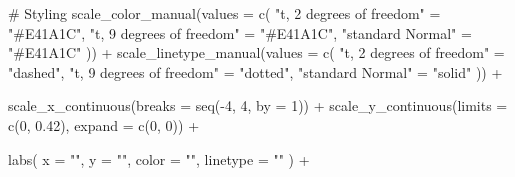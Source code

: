 \documentclass[
  letterpaper,
  DIV=11,
  numbers=noendperiod]{scrreprt}
\newenvironment{Shaded}{\begin{snugshade}}{\end{snugshade}}
\newcommand{\AttributeTok}[1]{\textcolor[rgb]{0.40,0.45,0.13}{#1}}
\newcommand{\CommentTok}[1]{\textcolor[rgb]{0.37,0.37,0.37}{#1}}
\newcommand{\DecValTok}[1]{\textcolor[rgb]{0.68,0.00,0.00}{#1}}
\newcommand{\FloatTok}[1]{\textcolor[rgb]{0.68,0.00,0.00}{#1}}
\newcommand{\FunctionTok}[1]{\textcolor[rgb]{0.28,0.35,0.67}{#1}}
\newcommand{\NormalTok}[1]{\textcolor[rgb]{0.00,0.23,0.31}{#1}}
\newcommand{\OtherTok}[1]{\textcolor[rgb]{0.00,0.23,0.31}{#1}}
\newcommand{\SpecialCharTok}[1]{\textcolor[rgb]{0.37,0.37,0.37}{#1}}
\newcommand{\StringTok}[1]{\textcolor[rgb]{0.13,0.47,0.30}{#1}}
\begin{document}
\begin{Shaded}
\begin{Highlighting}[]
  \CommentTok{\# Styling}
  \FunctionTok{scale\_color\_manual}\NormalTok{(}\AttributeTok{values =} \FunctionTok{c}\NormalTok{(}
    \StringTok{"t, 2 degrees of freedom"} \OtherTok{=} \StringTok{"\#E41A1C"}\NormalTok{,}
    \StringTok{"t, 9 degrees of freedom"} \OtherTok{=} \StringTok{"\#E41A1C"}\NormalTok{,}
    \StringTok{"standard Normal"} \OtherTok{=} \StringTok{"\#E41A1C"}
\NormalTok{  )) }\SpecialCharTok{+}
  \FunctionTok{scale\_linetype\_manual}\NormalTok{(}\AttributeTok{values =} \FunctionTok{c}\NormalTok{(}
    \StringTok{"t, 2 degrees of freedom"} \OtherTok{=} \StringTok{"dashed"}\NormalTok{,}
    \StringTok{"t, 9 degrees of freedom"} \OtherTok{=} \StringTok{"dotted"}\NormalTok{,}
    \StringTok{"standard Normal"} \OtherTok{=} \StringTok{"solid"}
\NormalTok{  )) }\SpecialCharTok{+}
  
  \FunctionTok{scale\_x\_continuous}\NormalTok{(}\AttributeTok{breaks =} \FunctionTok{seq}\NormalTok{(}\SpecialCharTok{{-}}\DecValTok{4}\NormalTok{, }\DecValTok{4}\NormalTok{, }\AttributeTok{by =} \DecValTok{1}\NormalTok{)) }\SpecialCharTok{+}
  \FunctionTok{scale\_y\_continuous}\NormalTok{(}\AttributeTok{limits =} \FunctionTok{c}\NormalTok{(}\DecValTok{0}\NormalTok{, }\FloatTok{0.42}\NormalTok{), }\AttributeTok{expand =} \FunctionTok{c}\NormalTok{(}\DecValTok{0}\NormalTok{, }\DecValTok{0}\NormalTok{)) }\SpecialCharTok{+}
  
  \FunctionTok{labs}\NormalTok{(}
    \AttributeTok{x =} \StringTok{""}\NormalTok{,}
    \AttributeTok{y =} \StringTok{""}\NormalTok{,}
    \AttributeTok{color =} \StringTok{""}\NormalTok{,}
    \AttributeTok{linetype =} \StringTok{""}
\NormalTok{  ) }\SpecialCharTok{+}
  

\end{Highlighting}
\end{Shaded}
\end{document}
